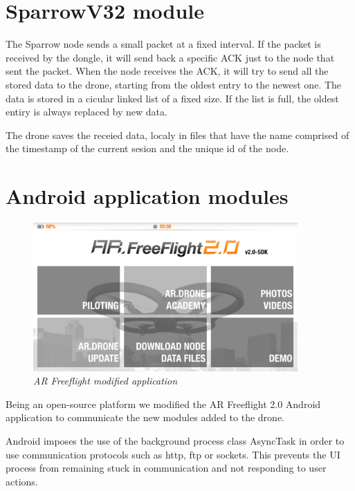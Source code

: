 \section{SparrowV32 module}

The Sparrow node sends a small packet at a fixed interval. If the packet is received by the dongle, it will send back a specific ACK just to the node that sent the packet. When the node receives the ACK, it will try to send all the stored data to the drone, starting from the oldest entry to the newest one. The data is stored in a cicular linked list of a fixed size. If the list is full, the oldest entiry is always replaced by new data.

The drone saves the receied data, localy in files that have the name comprised of the timestamp of the current sesion and the unique id of the node.

\section{Android application modules}

\begin{figure}[ht]
\begin{center}
\includegraphics[width=0.9\textwidth]{img/android_app.png}
\end{center}
\caption{\small \itshape{AR Freeflight modified application}}
\end{figure}

Being an open-source platform we modified the AR Freeflight 2.0 Android application to communicate the new modules added to the drone.

Android imposes the use of the background process class AsyncTask in order to use communication protocols such as http, ftp or sockets. This prevents the UI process from remaining stuck in communication and not responding to user actions.

